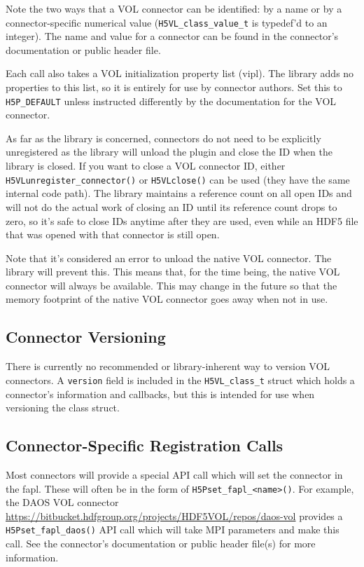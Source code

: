 Note the two ways that a VOL connector can be identified: by a name or by a connector-specific numerical value ({\tt H5VL\_class\_value\_t} is typedef'd to an integer). The name and value for a connector can be found in the connector's documentation or public header file.

Each call also takes a VOL initialization property list (vipl). The library adds no properties to this list, so it is entirely for use by connector authors. Set this to {\tt H5P\_DEFAULT} unless instructed differently by the documentation for the VOL connector.

As far as the library is concerned, connectors do not need to be explicitly unregistered as the library will unload the plugin and close the ID when the library is closed. If you want to close a VOL connector ID, either {\tt H5VLunregister\_connector()} or {\tt H5VLclose()} can be used (they have the same internal code path). The library maintains a reference count on all open IDs and will not do the actual work of closing an ID until its reference count drops to zero, so it's safe to close IDs anytime after they are used, even while an HDF5 file that was opened with that connector is still open.

Note that it's considered an error to unload the native VOL connector. The library will prevent this. This means that, for the time being, the native VOL connector will always be available. This may change in the future so that the memory footprint of the native VOL connector goes away when not in use.

\subsection{Connector Versioning}

\thgfuturewarning

There is currently no recommended or library-inherent way to version VOL connectors. A {\tt version} field is included in the {\tt H5VL\_class\_t} struct which holds a connector's information and callbacks, but this is intended for use when versioning the class struct.

\subsection{Connector-Specific Registration Calls}

Most connectors will provide a special API call which will set the connector in the fapl. These will often be in the form of {\tt H5Pset\_fapl\_<name>()}. For example, the DAOS VOL connector \url{https://bitbucket.hdfgroup.org/projects/HDF5VOL/repos/daos-vol} provides a {\tt H5Pset\_fapl\_daos()} API call which will take MPI parameters and make this call. See the connector's documentation or public header file(s) for more information.

